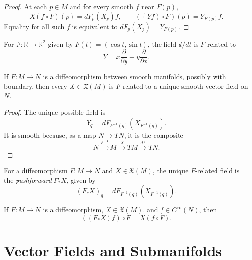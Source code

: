 \begin{proof}
\leanok
\sketch At each $p\in M$ and for every smooth $f$ near $F(p)$,
\[
X(f\circ F)(p)=dF_p(X_p)f,
\qquad ((Yf)\circ F)(p)=Y_{F(p)}f.
\]
Equality for all such $f$ is equivalent to $dF_p(X_p)=Y_{F(p)}$.
\end{proof}

\begin{example}
\label{ex:8-17}
\leanok
{}
For $F\colon\mathbb{R}\to\mathbb{R}^2$ given by
$F(t)=(\cos t,\sin t)$, the field $d/dt$ is $F$-related to
\[
Y=x\frac{\partial}{\partial y}-y\frac{\partial}{\partial x}.
\]
\end{example}


\begin{proposition}
\label{prop:8-19}
\leanok
{}
If $F\colon M\to N$ is a diffeomorphism between smooth manifolds, possibly
with boundary, then every $X\in\mathfrak{X}(M)$ is $F$-related to a unique
smooth vector field on $N$.
\end{proposition}

\begin{proof}
\leanok
\sketch The unique possible field is
\[
Y_q=dF_{F^{-1}(q)}(X_{F^{-1}(q)}).
\]
It is smooth because, as a map $N\to TN$, it is the composite
\[
N\xrightarrow{F^{-1}}M\xrightarrow{X}TM\xrightarrow{dF}TN.
\]
\end{proof}

\begin{definition}
\label{def:8-57-extra-2}
\mathlibok
{}
For a diffeomorphism $F\colon M\to N$ and $X\in\mathfrak{X}(M)$, the unique
$F$-related field is the \emph{pushforward} $F_*X$, given by
\[
(F_*X)_q=dF_{F^{-1}(q)}(X_{F^{-1}(q)}). \tag{8.7}
\]
\end{definition}

\begin{corollary}
\label{cor:8-21}
\leanok
{}
If $F\colon M\to N$ is a diffeomorphism, $X\in\mathfrak{X}(M)$, and
$f\in C^\infty(N)$, then
\[
((F_*X)f)\circ F=X(f\circ F).
\]
\end{corollary}

\section{Vector Fields and Submanifolds}

